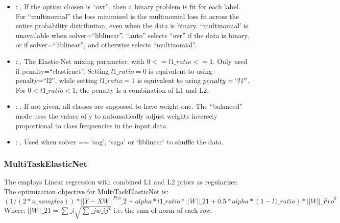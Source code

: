 \begin{itemize}
    \item {}: , 
      If the option chosen is ``ovr'', then a binary problem is fit for each label. For
      ``multinomial''                                                  the loss minimised is the
      multinomial loss fit across the entire probability distribution, even when the
      data is binary. ``multinomial' is unavailable when solver=``liblinear''. ``auto'' selects
      ``ovr'' if the data is                                                  binary, or if
      solver=``liblinear'', and otherwise selects ``multinomial''.

    \item {}: , 
      The Elastic-Net mixing parameter, with $0 <= l1\_ratio <= 1$. Only used if
      penalty=``elasticnet''.                                                  Setting $l1\_ratio=0$
      is equivalent to using penalty=``l2'', while setting $l1\_ratio=1$ is equivalent to using
      $penalty=``l1''$. For $0 < l1\_ratio <1$, the penalty is a combination of L1 and L2.

    \item {}: \xmlDesc{[balanced]}, 
      If not given, all classes are supposed to have weight one.
      The “balanced” mode uses the values of y to automatically adjust weights
      inversely proportional to class frequencies in the input data

    \item {}: , 
      Used when solver == ‘sag’, ‘saga’ or ‘liblinear’ to shuffle the data.
  \end{itemize}


\subsubsection{MultiTaskElasticNet}
  The  employs                         Linear regression with combined
  L1 and L2 priors as regularizer.                         The optimization objective for
  MultiTaskElasticNet is:                         $(1 / (2 * n\_samples)) * ||Y - XW||^{Fro}\_2
  + alpha * l1\_ratio * ||W||\_{21}                         + 0.5 * alpha * (1 - l1\_ratio) *
  ||W||\_{Fro}^2$                         \\Where:                         $||W||\_{21} = \sum\_i
  \sqrt{\sum\_j w\_{ij}^2}$                         i.e. the sum of norm of each row.

